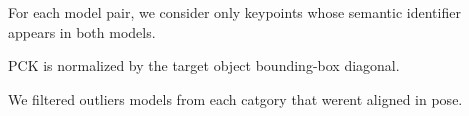 
For each model pair, we consider only keypoints whose semantic identifier appears in both models.

PCK is normalized by the target object bounding-box diagonal.

We filtered outliers models from each catgory that werent aligned in pose. 